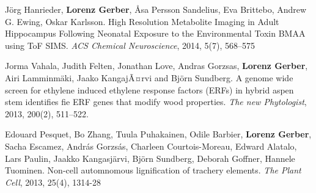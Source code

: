\documentclass[10pt]{article}
\begin{document}
\begin{bibenum}
                                                                                           \item J\"{o}rg Hanrieder, \textbf{Lorenz Gerber}, \AA sa Persson
                                                                                             Sandelius,  Eva Brittebo, Andrew G. Ewing, Oskar Karlsson.
                                                                                             High Resolution Metabolite Imaging in Adult Hippocampus
                                                                                             Following Neonatal Exposure to the Environmental Toxin BMAA
                                                                                             using ToF SIMS. \textit{ACS Chemical Neuroscience}, 2014,
                                                                                             5(7), 568--575\\

                                                                                           \item Jorma Vahala, Judith Felten, Jonathan Love, Andras Gorzsas,
                                                                                             \textbf{Lorenz Gerber}, Airi Lamminm\"{a}ki, Jaako KangajÃ¤rvi and Bj\"{o}rn
                                                                                             Sundberg.
                                                                                             A genome wide screen for ethylene induced ethylene response factors (ERFs) in hybrid aspen
                                                                                             stem identifies fie ERF genes that modify wood properties.
                                                                                             \textit{The new Phytologist}, 2013, 200(2), 511--522.\\


                                                                                           \item Edouard Pesquet, Bo Zhang, Tuula Puhakainen, Odile Barbier,
                                                                                             \textbf{Lorenz Gerber}, Sacha Escamez, Andr\'{a}s Gorzs\'{a}s,
                                                                                             Charleen Courtois-Moreau, Edward Alatalo, Lars Paulin,
                                                                                             Jaakko Kangasj\"arvi, Bj\"{o}rn Sundberg, Deborah Goffner,
                                                                                             Hannele Tuominen. Non-cell automnomous lignification of
                                                                                             trachery elements. \textit{The Plant Cell}, 2013, 25(4), 1314-28\\



\end{bibenum}
\end{document}

